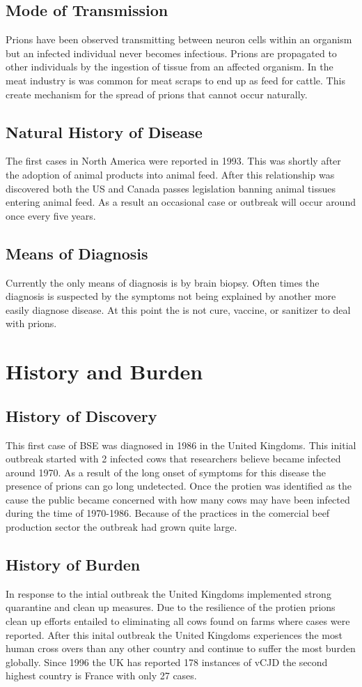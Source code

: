 \documentclass{report}
\begin{document}
\section{Mode of Transmission}
Prions have been observed transmitting between neuron cells within an organism but an infected individual never becomes infectious. Prions are propagated to other individuals by the ingestion of tissue from an affected organism. In the meat industry is was common for meat scraps to end up as feed for cattle. This create mechanism for the spread of prions that cannot occur naturally.
\section{Natural History of Disease}
The first cases in North America were reported in 1993. This was shortly after the adoption of animal products into animal feed. After this relationship was discovered both the US and Canada passes legislation banning animal tissues entering animal feed. As a result an occasional case or outbreak will occur around once every five years.
\section{Means of Diagnosis}
Currently the only means of diagnosis is by brain biopsy. Often times the diagnosis is suspected by the symptoms not being explained by another more easily diagnose disease. At this point the is not cure, vaccine, or sanitizer to deal with prions.
\chapter{History and Burden}
\section{History of Discovery}
This first case of BSE was diagnosed in 1986 in the United Kingdoms. This initial outbreak started with 2 infected cows that researchers believe became infected around 1970. As a result of the long onset of symptoms for this disease the presence of prions can go long undetected. Once the protien was identified as  the cause the public became concerned with how many cows may have been infected during the time of 1970-1986. Because of the practices in the comercial beef production sector the outbreak had grown quite large.

\section{History of Burden}
In response to the intial outbreak the United Kingdoms implemented strong quarantine and clean up measures. Due  to the resilience of the protien  prions clean up efforts entailed to eliminating all cows found on farms where cases were  reported. After this inital outbreak the United Kingdoms experiences the most human cross overs than any other country and continue to suffer the most burden globally. Since 1996 the UK has reported 178  instances of vCJD the second highest country is France with only  27 cases.
\end{document}
